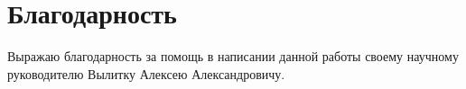 \chapter*{Благодарность}
Выражаю благодарность за помощь в написании данной работы своему научному руководителю Вылитку Алексею Александровичу.

\pagebreak